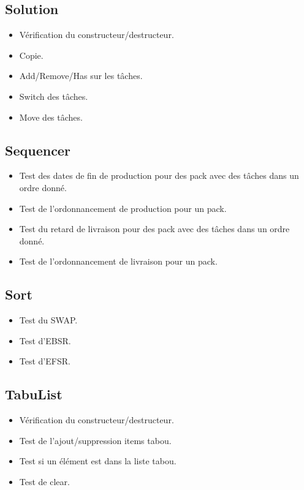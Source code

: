 \documentclass[hideweeklyreports]{polytech/polytech}
\begin{document}
			\subsection{Solution}
				\begin{itemize}
					\item Vérification du constructeur/destructeur.
					\item Copie.
					\item Add/Remove/Has sur les tâches.
					\item Switch des tâches.
					\item Move des tâches.
				\end{itemize}
				
			\subsection{Sequencer}
				\begin{itemize}
					\item Test des dates de fin de production pour des pack avec des tâches dans un ordre donné.
					\item Test de l'ordonnancement de production pour un pack.
					\item Test du retard de livraison pour des pack avec des tâches dans un ordre donné.
					\item Test de l'ordonnancement de livraison pour un pack.
				\end{itemize}
				
			\subsection{Sort}
				\begin{itemize}
					\item Test du SWAP.
					\item Test d'EBSR.
					\item Test d'EFSR.
				\end{itemize}
				
			\subsection{TabuList}
				\begin{itemize}
					\item Vérification du constructeur/destructeur.
					\item Test de l'ajout/suppression items tabou.
					\item Test si un élément est dans la liste tabou.
					\item Test de clear.
				\end{itemize}
				
\end{document}
